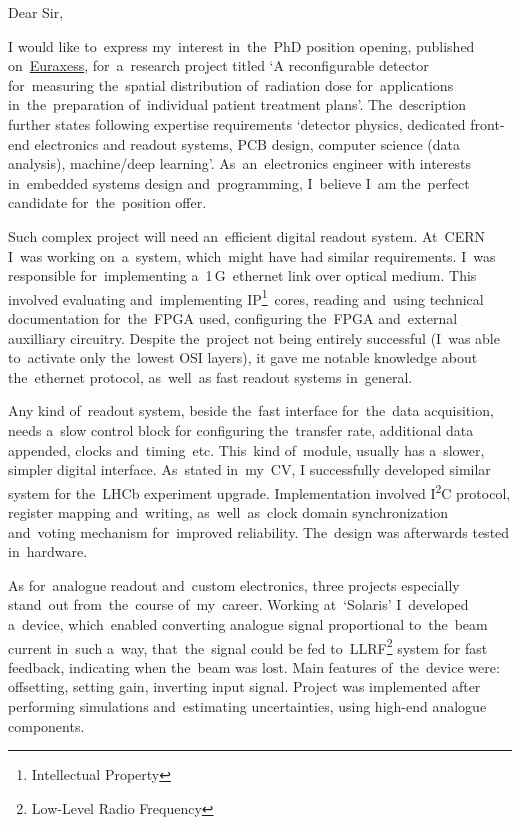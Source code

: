 \documentclass[11pt,a4paper,sans]{article}
\newcommand{\iic}{I\textsuperscript{2}C}
\begin{document}
	\noindent
	Dear Sir,
	\vspace{1\baselineskip}
	
	I would like to~express my~interest in~the~PhD position opening, published 
	on~\href{https://euraxess.ec.europa.eu/jobs/485237}{Euraxess}, for~a~research project
	titled `A reconfigurable detector for~measuring the~spatial distribution 
	of~radiation dose for~applications in~the~preparation of~individual patient treatment
	plans'. The~description further states following expertise requirements `detector physics,
	dedicated front-end electronics and readout systems, PCB design, computer science (data
	analysis), machine/deep learning'. As~an~electronics engineer with interests in~embedded 
	systems design and~programming, I~believe I~am the~perfect candidate for~the~position offer.
	
	Such complex project will need an~efficient digital 
	readout	system. At~CERN I~was working on~a~system, which~might have had similar requirements. 
	I~was responsible 
	for~implementing a~1$\,$G~ethernet link over optical medium. This involved evaluating
	and~implementing IP\footnote{Intellectual Property}~cores, reading and~using technical 
	documentation for~the~FPGA used, configuring the~FPGA and~external auxilliary circuitry. 
	Despite the~project not being
	entirely successful (I~was able to~activate only the~lowest OSI layers), it gave me 
	notable knowledge about the~ethernet protocol, as~well~as fast 
	readout systems in~general. 
	
	Any kind of~readout system, beside the~fast interface for~the~data acquisition, needs a~slow
	control block for configuring the~transfer rate, additional data appended, clocks 
	and~timing~etc. This~kind
	of~module, usually has a~slower, simpler digital interface. As~stated in~my~CV, I successfully
	developed similar system for the~LHCb experiment upgrade. Implementation involved \iic\space 
	protocol, register mapping and~writing, as~well~as~clock domain synchronization and~voting
	mechanism for~improved reliability. The~design was afterwards tested in~hardware.
	
	As for~analogue readout and~custom electronics, three projects especially stand~out 
	from~the~course of~my~career. Working at~`Solaris' I~developed a~device, which~enabled 
	converting analogue signal proportional to~the~beam current in~such a~way, that~the~signal
	could be fed to~LLRF\footnote{Low-Level Radio Frequency} system for fast feedback, indicating 
	when the~beam
	was lost. Main features of~the~device were: offsetting, setting gain, inverting input signal.
	Project was implemented after performing simulations and~estimating uncertainties, using 
	high-end analogue components.
	
\end{document}
